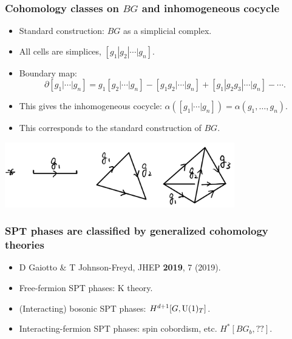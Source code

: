 \documentclass[xcolor=table, aspectratio=43,ignorenonframetext]{beamer}
\newcommand{\uone}{\text U(1)}
\begin{document}
\begin{frame}
	\frametitle{Cohomology classes on $BG$ and inhomogeneous cocycle}
	\begin{itemize}
		\item Standard construction: $BG$ as a simplicial complex.
		\item All cells are simplices, $[g_1|g_2|\cdots|g_n]$.
		\item Boundary map:
		\[\partial[g_1|\cdots|g_n]=g_1[g_2|\cdots|g_n]
		-[g_1g_2|\cdots|g_n]+[g_1|g_2g_3|\cdots|g_n]-\cdots.\]
		\item This gives the inhomogeneous cocycle:
		$\alpha([g_1|\cdots|g_n])=\alpha(g_1,\ldots,g_n)$.
		\item This corresponds to the standard construction of $BG$.
	\end{itemize}
\begin{center}
	\includegraphics[width=10cm]{../chainmap/bg-std}
\end{center}
\end{frame}

\begin{frame}
	\frametitle{SPT phases are classified by generalized cohomology theories}
	\begin{itemize}
		\item D Gaiotto \& T Johnson-Freyd, JHEP \textbf{2019}, 7 (2019).
		\item Free-fermion SPT phases: K theory.
		\item (Interacting) bosonic SPT phases: $H^{d+1}[G, \uone_T]$.
		\item Interacting-fermion SPT phases: spin cobordism, etc.
		$H^*[BG_b, ??]$.
	\end{itemize}
\end{frame}

\end{document}
